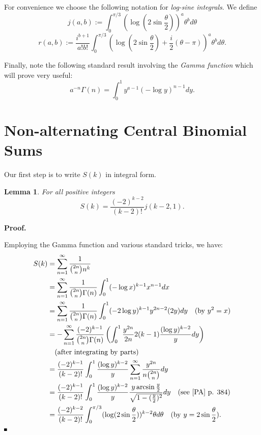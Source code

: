 \documentclass[a4paper,a4paper]{article}
\newtheorem{Lem}{Lemma}
\newcommand{\eop}{\vrule height .9ex width .9ex depth -.1ex}
\begin{document}
For convenience we choose the following notation for {\em log-sine integrals}.
 We define
\begin{equation}
\label{eq:j}
 j(a,b) := \int_0^{\pi/3} (\log(2\sin \frac{\theta}{2} ))^a
 \theta^b d\theta
 \end{equation}
\begin{equation}
\label{eq:r}
  r(a,b) := \frac{i^{b+1}}{a!b!} \int_0^{\pi/3}
 \left( \log \left( 2\sin \frac{\theta}{
2} \right) + \frac{i}{2}\left( \theta - \pi \right) \right)^a \theta^b
d\theta .\end{equation}

Finally, note the following standard result involving the {\em Gamma
function}
which will prove very useful:
$$
a^{-n}\Gamma(n) = \int_0^1 y^{a-1} (-\log y)^{n-1} dy.
$$

\section{Non-alternating Central Binomial Sums}

Our first step is to write $ S(k) $ in integral form.
\begin{Lem} For all  positive integers
\begin{equation}
 S(k) = \frac{(-2)^{k-2}}{(k-2)!} j(k-2, 1).
\end{equation}
\end{Lem}

{\raggedright \bf Proof.}
Employing the Gamma function and various standard tricks, we have:
\begin{align*}
S(k) &= \sum_{n=1}^\infty \frac{1}{{2n \choose n} n^k}  \\
	    &= \sum_{n=1}^\infty \frac{1}{{2n \choose n} \Gamma(n)}
	     \int_0^1 (-\log x)^{k-1} x^{n-1} dx  \\
	    &= \sum_{n=1}^\infty \frac{1}{{2n \choose n} \Gamma(n)}
	     \int_0^1 (-2\log y)^{k-1} y^{2n -2} (2y) dy
	     \quad \text{(by $ y^2 = x $)} \\
	   &=- \sum_{n=1}^\infty \frac{(-2)^{k-1}}{ {2n \choose n}
	   \Gamma(n)} \left(
	    \int_0^1 \frac{y^{2n}}{2n} 2(k-1)\frac{(\log y)^{k-2}}{y} dy
	    \right)\\
	     &\quad \text{(after integrating by parts)}  \\
	  &= \frac{(-2)^{k-1}}{(k-2)!} \int_0^1
\frac{(\log y)^{k-2}}{y} \sum_{n=1}^\infty \frac{y^{2n}}{n {2n \choose n}}dy\\
	 &= \frac{(-2)^{k-1}}{(k-2)!} \int_0^1 \frac{(\log y)^{k-2}}{y}
	 \frac{y        \arcsin \frac{y}{2}}{\sqrt{1-(\frac{y}{2})^2}} dy
	 \quad  \text{(see~\cite{PA} p. 384)} \\
	&= \frac{(-2)^{k-2}}{(k - 2)!} \int_0^{\pi/3} (\log(2 \sin
	\frac{\theta}{2}))^{k-2} \theta d\theta
	\quad \text{(by $ y = 2\sin \frac{\theta}{2} $)}.
\end{align*}
$\eop$
\end{document}
